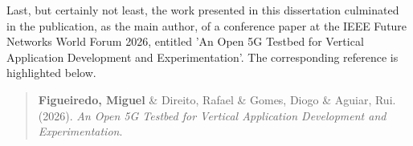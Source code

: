 Last, but certainly not least, the work presented in this dissertation culminated in the publication, as the main author, of a conference paper at the \acs{IEEE} Future Networks World Forum 2026, entitled 'An Open \acs{5G} Testbed for Vertical Application Development and Experimentation'. The corresponding reference is highlighted below.

\begin{quote}
    \textbf{Figueiredo, Miguel} \& Direito, Rafael \& Gomes, Diogo \& Aguiar, Rui. (2026). \newline \textit{An Open 5G Testbed for Vertical Application Development and Experimentation}.
\end{quote}
